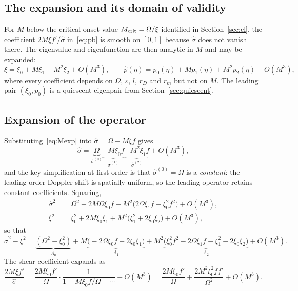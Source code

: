\documentclass[11pt,a4paper]{article}
\newcommand{\Om}{\Omega}
\newcommand{\eps}{\varepsilon}
\newcommand{\sig}{\hat\sigma}
\theoremstyle{plain}
\theoremstyle{remark}
\begin{document}
\subsection{The expansion and its domain of validity}
For $M$ below the critical onset value $M_{\rm crit}=\Om/\xi$ identified in Section~\ref{sec:cl}, the
coefficient $2M\xi f'/\sig$ in~\eqref{eq:pb} is smooth on $[0,1]$ because $\sig$ does not vanish there.
The eigenvalue and eigenfunction are then analytic in $M$ and may be expanded:
\begin{equation}
\xi=\xi_0+M\xi_1+M^2\xi_2+O(M^3),
\qquad
\hat p(\eta)=p_0(\eta)+Mp_1(\eta)+M^2p_2(\eta)+O(M^3),
\label{eq:Mexp}
\end{equation}
where every coefficient depends on $\Om$, $\eps$, $l$, $r_D$ and $r_m$ but not on $M$. The
leading pair $(\xi_0,p_0)$ is a quiescent eigenpair from Section~\ref{sec:quiescent}.

\subsection{Expansion of the operator}
Substituting~\eqref{eq:Mexp} into $\sig=\Om-M\xi f$ gives
\begin{equation}
\sig=\underbrace{\Om}_{\sig^{(0)}}
\underbrace{-M\xi_0f}_{\sig^{(1)}}
\underbrace{-M^2\xi_1f}_{\sig^{(2)}}+O(M^3),
\label{eq:sigexp}
\end{equation}
and the key simplification at first order is that $\sig^{(0)}=\Om$ is a \emph{constant}: the
leading-order Doppler shift is spatially uniform, so the leading operator retains constant
coefficients. Squaring,
\begin{align}
\sig^2&=\Om^2-2M\Om\xi_0f-M^2\bigl(2\Om\xi_1f-\xi_0^2f^2\bigr)+O(M^3),\\
\xi^2&=\xi_0^2+2M\xi_0\xi_1+M^2\bigl(\xi_1^2+2\xi_0\xi_2\bigr)+O(M^3),
\end{align}
so that
\begin{equation}
\sig^2-\xi^2=\underbrace{(\Om^2-\xi_0^2)}_{A_0}
+M\underbrace{\bigl(-2\Om\xi_0f-2\xi_0\xi_1\bigr)}_{A_1}
+M^2\underbrace{\bigl(\xi_0^2f^2-2\Om\xi_1f-\xi_1^2-2\xi_0\xi_2\bigr)}_{A_2}+O(M^3).
\label{eq:Aexp}
\end{equation}
The shear coefficient expands as
\begin{equation}
\frac{2M\xi f'}{\sig}
=\frac{2M\xi_0f'}{\Om}\cdot\frac{1}{1-M\xi_0f/\Om+\cdots}+O(M^3)
=\frac{2M\xi_0f'}{\Om}+\frac{2M^2\xi_0^2ff'}{\Om^2}+O(M^3).
\label{eq:shearexp}
\end{equation}
\end{document}
